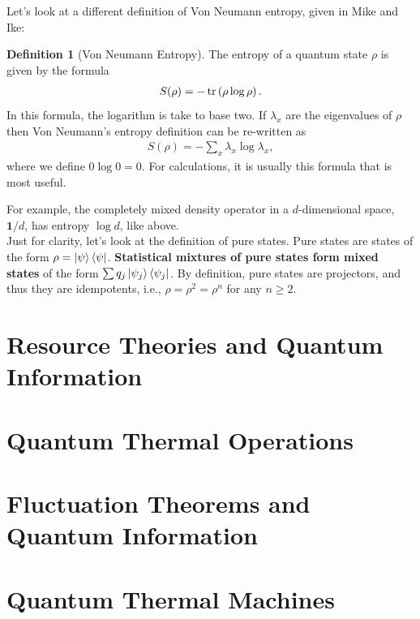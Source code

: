\documentclass{book}
\theoremstyle{definition}
\newtheorem{defn}{Definition}[section]
\newcommand{\lp}{\left(}
\newcommand{\rp}{\right)}
\begin{document}
Let's look at a different definition of Von Neumann entropy, given in Mike and Ike:
\begin{defn}[Von Neumann Entropy]
	The entropy of a quantum state $\rho$ is given by the formula
	\begin{align}
	S(\rho) = -\tr\lp \rho \log \rho \rp.
	\end{align}
	In this formula, the logarithm is take to base two. If $\lambda_x$ are the eigenvalues of $\rho$ then Von Neumann's entropy definition can be re-written as
	\begin{align}
	S(\rho) = -\sum_x \lambda_x \log \lambda_x,
	\end{align}
	where we define $0 \log 0 = 0$. For calculations, it is usually this formula that is most useful. 
\end{defn}


For example, the completely mixed density operator in a $d$-dimensional space, $\bm{1}/d$, has entropy $\log d$, like above. \\


Just for clarity, let's look at the definition of pure states. Pure states are states of the form $\rho = \ket{\psi}\bra{\psi}$. \textbf{Statistical mixtures of pure states form mixed states} of the form $\sum q_j \ket{\psi_j}\bra{\psi_j}$. By definition, pure states are projectors, and thus they are idempotents, i.e., $\rho = \rho^2 = \rho^n$ for any $n\geq 2$. 









\newpage

\section{Resource Theories and Quantum Information}


\newpage
\section{Quantum Thermal Operations}


\newpage
\section{Fluctuation Theorems and Quantum Information}


\newpage
\section{Quantum Thermal Machines}
\end{document}

